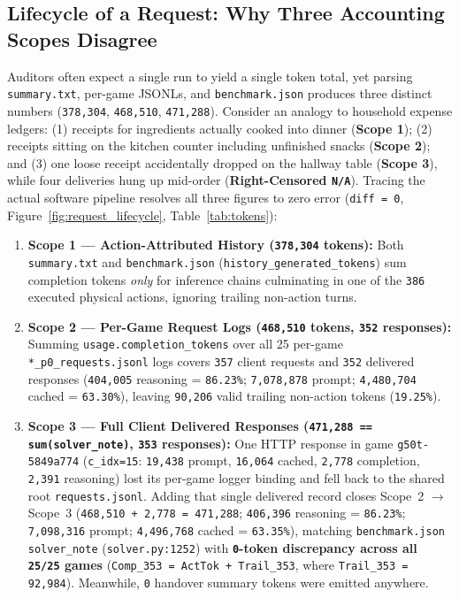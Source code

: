 \documentclass[10pt]{article}
\newcommand{\code}[1]{\texttt{#1}}
\begin{document}
\subsection{Lifecycle of a Request: Why Three Accounting Scopes Disagree}
Auditors often expect a single run to yield a single token total, yet parsing \code{summary.txt}, per-game JSONLs, and \code{benchmark.json} produces three distinct numbers (\code{378,304}, \code{468,510}, \code{471,288}). Consider an analogy to household expense ledgers: (1) receipts for ingredients actually cooked into dinner (\textbf{Scope 1}); (2) receipts sitting on the kitchen counter including unfinished snacks (\textbf{Scope 2}); and (3) one loose receipt accidentally dropped on the hallway table (\textbf{Scope 3}), while four deliveries hung up mid-order (\textbf{Right-Censored \code{N/A}}). Tracing the actual software pipeline resolves all three figures to zero error (\code{diff = 0}, Figure~\ref{fig:request_lifecycle}, Table~\ref{tab:tokens}):
\begin{enumerate}[leftmargin=1.4em,itemsep=2pt]
\item \textbf{Scope 1 --- Action-Attributed History (\code{378,304} tokens):} Both \code{summary.txt} and \code{benchmark.json} (\code{history\_generated\_tokens}) sum completion tokens \emph{only} for inference chains culminating in one of the \code{386} executed physical actions, ignoring trailing non-action turns.
\item \textbf{Scope 2 --- Per-Game Request Logs (\code{468,510} tokens, \code{352} responses):} Summing \code{usage.\allowbreak completion\_\allowbreak tokens} over all 25 per-game \code{*\_p0\_\allowbreak requests.\allowbreak jsonl} logs covers \code{357} client requests and \code{352} delivered responses (\code{404,005} reasoning = \code{86.23\%}; \code{7,078,878} prompt; \code{4,480,704} cached = \code{63.30\%}), leaving \code{90,206} valid trailing non-action tokens (\code{19.25\%}).
\item \textbf{Scope 3 --- Full Client Delivered Responses (\code{471,288 == sum(solver\_note)}, \code{353} responses):} One HTTP response in game \code{g50t-5849a774} (\code{c\_idx=15}: \code{19,438} prompt, \code{16,064} cached, \code{2,778} completion, \code{2,391} reasoning) lost its per-game logger binding and fell back to the shared root \code{requests.jsonl}. Adding that single delivered record closes Scope~2 $\to$ Scope~3 (\code{468,510 + 2,778 = 471,288}; \code{406,396} reasoning = \code{86.23\%}; \code{7,098,316} prompt; \code{4,496,768} cached = \code{63.35\%}), matching \code{benchmark.json} \code{solver\_note} (\code{solver.py:1252}) with \textbf{\code{0}-token discrepancy across all \code{25/25} games} (\code{Comp\_353 = ActTok + Trail\_353}, where \code{Trail\_353 = 92,984}). Meanwhile, \code{0} handover summary tokens were emitted anywhere.
\end{enumerate}
\end{document}
